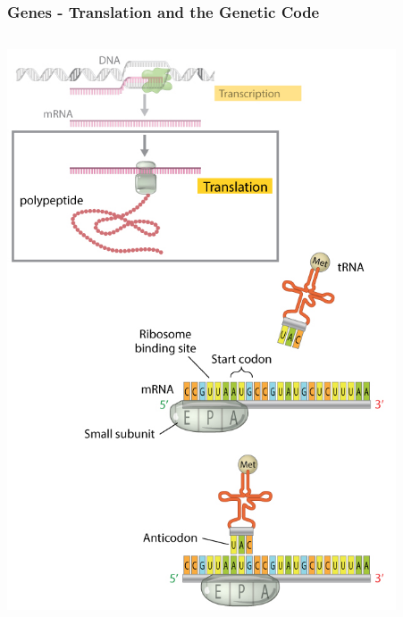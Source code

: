 \documentclass{beamer}
\begin{document}
\begin{frame}
	\frametitle{Genes - Translation and the Genetic Code}
	
	
	
	\begin{columns}
	
		\begin{column}{0.5\textwidth}
			\centering	\includegraphics[keepaspectratio, width  = 0.9\textwidth]{img/translation}\\
		\end{column}
	\begin{column}{0.5\textwidth}
	

\end{column}
\end{columns}
\end{frame}
\end{document}
